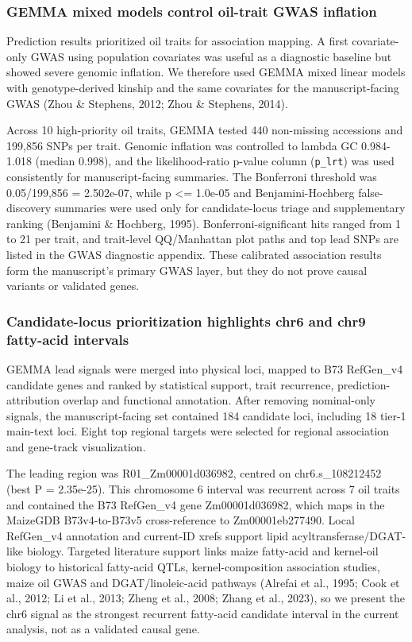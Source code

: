 \documentclass[
]{article}
\begin{document}
\subsubsection{GEMMA mixed models control oil-trait GWAS
inflation}\label{gemma-mixed-models-control-oil-trait-gwas-inflation}

Prediction results prioritized oil traits for association mapping. A
first covariate-only GWAS using population covariates was useful as a
diagnostic baseline but showed severe genomic inflation. We therefore
used GEMMA mixed linear models with genotype-derived kinship and the
same covariates for the manuscript-facing GWAS (Zhou \& Stephens, 2012;
Zhou \& Stephens, 2014).

Across 10 high-priority oil traits, GEMMA tested 440 non-missing
accessions and 199,856 SNPs per trait. Genomic inflation was controlled
to lambda GC 0.984-1.018 (median 0.998), and the likelihood-ratio
p-value column (\texttt{p\_lrt}) was used consistently for
manuscript-facing summaries. The Bonferroni threshold was 0.05/199,856 =
2.502e-07, while p \textless= 1.0e-05 and Benjamini-Hochberg
false-discovery summaries were used only for candidate-locus triage and
supplementary ranking (Benjamini \& Hochberg, 1995).
Bonferroni-significant hits ranged from 1 to 21 per trait, and
trait-level QQ/Manhattan plot paths and top lead SNPs are listed in the
GWAS diagnostic appendix. These calibrated association results form the
manuscript's primary GWAS layer, but they do not prove causal variants
or validated genes.

\subsubsection{Candidate-locus prioritization highlights chr6 and chr9
fatty-acid
intervals}\label{candidate-locus-prioritization-highlights-chr6-and-chr9-fatty-acid-intervals}

GEMMA lead signals were merged into physical loci, mapped to B73
RefGen\_v4 candidate genes and ranked by statistical support, trait
recurrence, prediction-attribution overlap and functional annotation.
After removing nominal-only signals, the manuscript-facing set contained
184 candidate loci, including 18 tier-1 main-text loci. Eight top
regional targets were selected for regional association and gene-track
visualization.

The leading region was R01\_Zm00001d036982, centred on chr6.s\_108212452
(best P = 2.35e-25). This chromosome 6 interval was recurrent across 7
oil traits and contained the B73 RefGen\_v4 gene Zm00001d036982, which
maps in the MaizeGDB B73v4-to-B73v5 cross-reference to Zm00001eb277490.
Local RefGen\_v4 annotation and current-ID xrefs support lipid
acyltransferase/DGAT-like biology. Targeted literature support links
maize fatty-acid and kernel-oil biology to historical fatty-acid QTLs,
kernel-composition association studies, maize oil GWAS and
DGAT/linoleic-acid pathways (Alrefai et al., 1995; Cook et al., 2012; Li
et al., 2013; Zheng et al., 2008; Zhang et al., 2023), so we present the
chr6 signal as the strongest recurrent fatty-acid candidate interval in
the current analysis, not as a validated causal gene.
\end{document}
